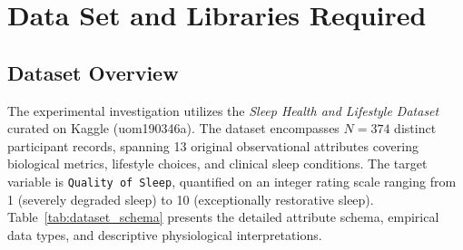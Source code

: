 \documentclass[12pt,a4paper]{article}
\begin{document}
\section{Data Set and Libraries Required}

\subsection{Dataset Overview}
The experimental investigation utilizes the \textit{Sleep Health and Lifestyle Dataset} curated on Kaggle (uom190346a). The dataset encompasses $N = 374$ distinct participant records, spanning 13 original observational attributes covering biological metrics, lifestyle choices, and clinical sleep conditions. The target variable is \texttt{Quality of Sleep}, quantified on an integer rating scale ranging from 1 (severely degraded sleep) to 10 (exceptionally restorative sleep). Table~\ref{tab:dataset_schema} presents the detailed attribute schema, empirical data types, and descriptive physiological interpretations.
\end{document}
